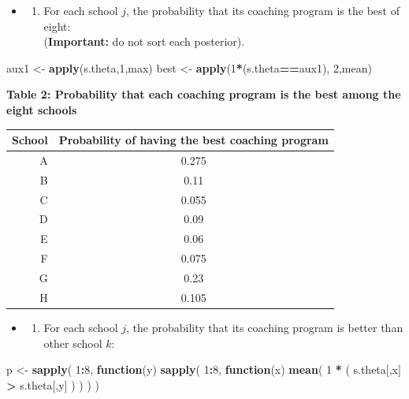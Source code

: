 \documentclass[]{article}
\newenvironment{Shaded}{\begin{snugshade}}{\end{snugshade}}
\newcommand{\KeywordTok}[1]{\textcolor[rgb]{0.13,0.29,0.53}{\textbf{#1}}}
\newcommand{\DecValTok}[1]{\textcolor[rgb]{0.00,0.00,0.81}{#1}}
\newcommand{\StringTok}[1]{\textcolor[rgb]{0.31,0.60,0.02}{#1}}
\newcommand{\ControlFlowTok}[1]{\textcolor[rgb]{0.13,0.29,0.53}{\textbf{#1}}}
\newcommand{\OperatorTok}[1]{\textcolor[rgb]{0.81,0.36,0.00}{\textbf{#1}}}
\newcommand{\NormalTok}[1]{#1}
\providecommand{\tightlist}{%
  \setlength{\itemsep}{0pt}\setlength{\parskip}{0pt}}
\begin{document}
\begin{itemize}
\item
  \begin{enumerate}
  \def\labelenumi{(\roman{enumi})}
  \tightlist
  \item
    For each school \(j\), the probability that its coaching program is
    the best of eight:\\
    (\textbf{Important:} do not sort each posterior).
  \end{enumerate}
\end{itemize}

\begin{Shaded}
\begin{Highlighting}[]
\NormalTok{aux1            <-}\StringTok{ }\KeywordTok{apply}\NormalTok{(s.theta,}\DecValTok{1}\NormalTok{,max)}
\NormalTok{best            <-}\StringTok{ }\KeywordTok{apply}\NormalTok{(}\DecValTok{1}\OperatorTok{*}\NormalTok{(s.theta}\OperatorTok{==}\NormalTok{aux1), }\DecValTok{2}\NormalTok{,mean)}
\end{Highlighting}
\end{Shaded}

\textbf{Table 2: Probability that each coaching program is the best
among the eight schools}

\begin{longtable}[]{@{}rc@{}}
\toprule
School & Probability of having the best coaching program\tabularnewline
\midrule
\endhead
A & 0.275\tabularnewline
B & 0.11\tabularnewline
C & 0.055\tabularnewline
D & 0.09\tabularnewline
E & 0.06\tabularnewline
F & 0.075\tabularnewline
G & 0.23\tabularnewline
H & 0.105\tabularnewline
\bottomrule
\end{longtable}

\begin{itemize}
\item
  \begin{enumerate}
  \def\labelenumi{(\roman{enumi})}
  \setcounter{enumi}{1}
  \tightlist
  \item
    For each school \(j\), the probability that its coaching program is
    better than other school \(k\):
  \end{enumerate}
\end{itemize}

\begin{Shaded}
\begin{Highlighting}[]
\NormalTok{p               <-}\StringTok{ }\KeywordTok{sapply}\NormalTok{( }\DecValTok{1}\OperatorTok{:}\DecValTok{8}\NormalTok{,}
                          \ControlFlowTok{function}\NormalTok{(y) }\KeywordTok{sapply}\NormalTok{( }\DecValTok{1}\OperatorTok{:}\DecValTok{8}\NormalTok{,}
                                             \ControlFlowTok{function}\NormalTok{(x) }
                                               \KeywordTok{mean}\NormalTok{( }\DecValTok{1} \OperatorTok{*}\StringTok{ }\NormalTok{( s.theta[,x] }\OperatorTok{>}\StringTok{ }\NormalTok{s.theta[,y] ) ) }
\NormalTok{                                             ) }
\NormalTok{                          )}
\end{Highlighting}
\end{Shaded}
\end{document}
